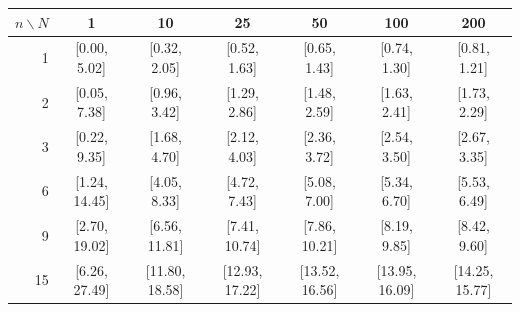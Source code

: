 \begin{tabular}{@{}rcccccc@{}}
\toprule
$n \backslash N$ & 1 & 10 & 25 & 50 & 100 & 200 \\
\midrule
1 & [0.00, 5.02] & [0.32, 2.05] & [0.52, 1.63] & [0.65, 1.43] & [0.74, 1.30] & [0.81, 1.21] \\
2 & [0.05, 7.38] & [0.96, 3.42] & [1.29, 2.86] & [1.48, 2.59] & [1.63, 2.41] & [1.73, 2.29] \\
3 & [0.22, 9.35] & [1.68, 4.70] & [2.12, 4.03] & [2.36, 3.72] & [2.54, 3.50] & [2.67, 3.35] \\
6 & [1.24, 14.45] & [4.05, 8.33] & [4.72, 7.43] & [5.08, 7.00] & [5.34, 6.70] & [5.53, 6.49] \\
9 & [2.70, 19.02] & [6.56, 11.81] & [7.41, 10.74] & [7.86, 10.21] & [8.19, 9.85] & [8.42, 9.60] \\
15 & [6.26, 27.49] & [11.80, 18.58] & [12.93, 17.22] & [13.52, 16.56] & [13.95, 16.09] & [14.25, 15.77] \\
\bottomrule
\end{tabular}

